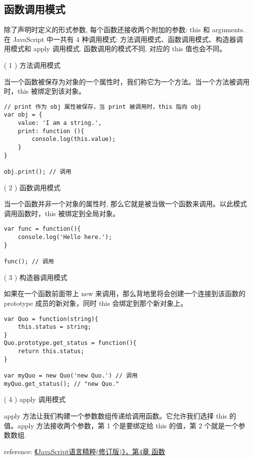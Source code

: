 \subsection{函数调用模式}\hypertarget{section-4}{}\label{section-4}

除了声明时定义的形式参数, 每个函数还接收两个附加的参数: this 和 arguments. 在 JavaScript 中一共有 4 种调用模式: 方法调用模式、函数调用模式、构造器调用模式和 apply 调用模式. 函数调用的模式不同, 对应的 this 值也会不同。

( 1 ) 方法调用模式

当一个函数被保存为对象的一个属性时，我们称它为一个方法。当一个方法被调用时，this 被绑定到该对象。

\begin{verbatim}// print 作为 obj 属性被保存，当 print 被调用时，this 指向 obj
var obj = {
    value: 'I am a string.',
    print: function (){
        console.log(this.value);
    }
}

obj.print(); // 调用
\end{verbatim}

( 2 ) 函数调用模式

当一个函数并非一个对象的属性时, 那么它就是被当做一个函数来调用。以此模式调用函数时，this 被绑定到全局对象。

\begin{verbatim}var func = function(){
    console.log('Hello here.');
}

func(); // 调用
\end{verbatim}

( 3 ) 构造器调用模式

如果在一个函数前面带上 new 来调用，那么背地里将会创建一个连接到该函数的 prototype 成员的新对象，同时 this 会绑定到那个新对象上。

\begin{verbatim}var Quo = function(string){
    this.status = string;
}
Quo.prototype.get_status = function(){
    return this.status;
}

var myQuo = new Quo('new Quo.') // 调用
myQuo.get_status(); // "new Quo."
\end{verbatim}

( 4 ) apply 调用模式

apply 方法让我们构建一个参数数组传递给调用函数。它允许我们选择 this 的值。apply 方法接收两个参数，第 1 个是要绑定给 this 的值，第 2 个就是一个参数数组.

reference: \href{http://book.douban.com/subject/3590768/}{《JavaScript语言精粹(修订版)》，第4章 函数}


